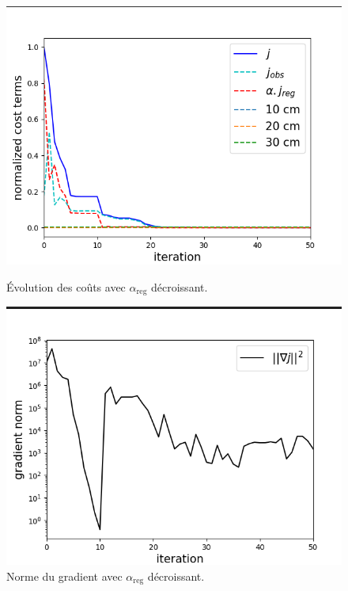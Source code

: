 \documentclass{article}
\begin{document}
\begin{figure}[H]
    \centering
    \begin{minipage}[b]{0.48\linewidth}
        \centering
        \includegraphics[width=\linewidth]{Images_Ayoub/With_Regularisation/Decreasing_Alpha/Costs.png}
        \caption{Évolution des coûts avec \(\alpha_{\text{reg}}\) décroissant.}
        \label{fig:dec-costs}
    \end{minipage}
    \hfill
    \begin{minipage}[b]{0.48\linewidth}
        \centering
        \includegraphics[width=\linewidth]{Images_Ayoub/With_Regularisation/Decreasing_Alpha/Gradient.png}
        \caption{Norme du gradient avec \(\alpha_{\text{reg}}\) décroissant.}
        \label{fig:dec-gradient}
    \end{minipage}
    

\end{figure}
\end{document}
